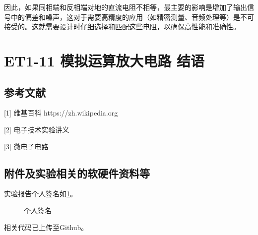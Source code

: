 \documentclass[dvipsnames, svgnames,a4paper,11pt]{article}
\begin{document}
	因此，如果同相端和反相端对地的直流电阻不相等，最主要的影响是增加了输出信号中的偏差和噪声，这对于需要高精度的应用（如精密测量、音频处理等）是不可接受的。这就需要设计时仔细选择和匹配这些电阻，以确保高性能和准确性。
	
	
	
	\clearpage
	
	\section{ET1-11 模拟运算放大电路 \quad\heiti 结语}
	
	
	
	\subsection{参考文献}
	[1] 维基百科 https://zh.wikipedia.org
	
	[2] 电子技术实验讲义
	
	[3] 微电子电路
	
	
	\subsection{附件及实验相关的软硬件资料等}
	
	实验报告个人签名如\cref{fig:name}。
	
	\begin{figure}[htbp]
		\centering
		\caption{个人签名}
		\label{fig:name}			
	\end{figure}
	
	
	相关代码已上传至Github。
	
	
	
\end{document}
